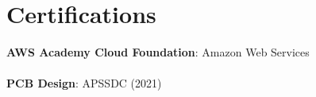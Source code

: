 \documentclass[letterpaper,9pt]{article}
\begin{document}
\section{Certifications}
 \begin{itemize}[leftmargin=0.15in, label={}]
    \small{\item{
     \textbf{AWS Academy Cloud Foundation}{: Amazon Web Services} \\\\
     \textbf{PCB Design}{: APSSDC (2021)} \\\\
    }}
 \end{itemize}
\end{document}
